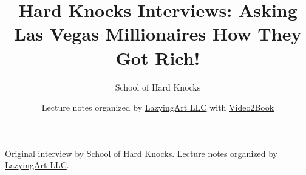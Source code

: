 \documentclass[11pt,oneside]{book}
\begin{document}
\frontmatter
\title{Hard Knocks Interviews: Asking Las Vegas Millionaires How They Got Rich!}
\author{School of Hard Knocks}
\date{Lecture notes organized by \href{https://lazying.art}{LazyingArt LLC} with \href{https://github.com/lachlanchen/Video2Book}{Video2Book}}
\maketitle
\begin{center}
\small Original interview by School of Hard Knocks. Lecture notes organized by \href{https://lazying.art}{LazyingArt LLC}.
\end{center}
\clearpage
\mainmatter

\end{document}
